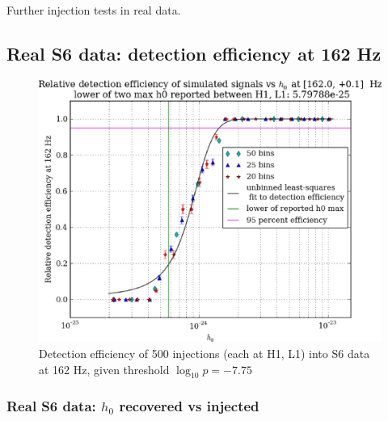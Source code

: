 
Further injection tests in real data.


\subsection{Real S6 data: detection efficiency at 162 Hz}

\begin{figure}
\begin{center}
\includegraphics[width=0.5\paperwidth,height=0.35\paperheight]{plots/detectionEfficiencyh0-162-0Hz.eps}
\caption{
Detection efficiency of 500 injections (each at H1, L1) into
S6 data at 162 Hz, given threshold $\log_{10}p = -7.75$}
\end{center}
\end{figure}

\subsubsection{Real S6 data: $h_0$ recovered vs injected}


